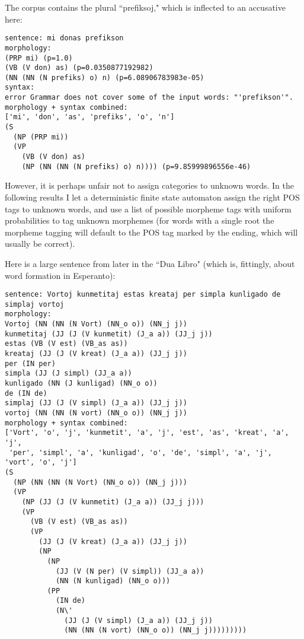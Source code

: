 \documentclass[10pt,a4paper]{article}
\begin{document}
The corpus contains the plural ``prefiksoj," which is inflected to an accusative here:

\begin{verbatim}
sentence: mi donas prefikson
morphology:
(PRP mi) (p=1.0)
(VB (V don) as) (p=0.0350877192982)
(NN (NN (N prefiks) o) n) (p=6.08906783983e-05)
syntax:
error Grammar does not cover some of the input words: "'prefikson'".
morphology + syntax combined:
['mi', 'don', 'as', 'prefiks', 'o', 'n']
(S
  (NP (PRP mi))
  (VP
    (VB (V don) as)
    (NP (NN (NN (N prefiks) o) n)))) (p=9.85999896556e-46)
\end{verbatim}

However, it is perhaps unfair not to assign categories to unknown words. 
In the following results I let a deterministic finite state automaton
assign the right POS tags to unknown words, and use a list of possible
morpheme tags with uniform probabilities to tag unknown morphemes (for words
with a single root the morpheme tagging will default to the POS tag marked
by the ending, which will usually be correct).

Here is a large sentence from later in the ``Dua Libro" (which is, fittingly,
about word formation in Esperanto):

\begin{verbatim}
sentence: Vortoj kunmetitaj estas kreataj per simpla kunligado de simplaj vortoj
morphology:
Vortoj (NN (NN (N Vort) (NN_o o)) (NN_j j))
kunmetitaj (JJ (J (V kunmetit) (J_a a)) (JJ_j j))
estas (VB (V est) (VB_as as))
kreataj (JJ (J (V kreat) (J_a a)) (JJ_j j))
per (IN per)
simpla (JJ (J simpl) (JJ_a a))
kunligado (NN (J kunligad) (NN_o o))
de (IN de)
simplaj (JJ (J (V simpl) (J_a a)) (JJ_j j))
vortoj (NN (NN (N vort) (NN_o o)) (NN_j j))
morphology + syntax combined:
['Vort', 'o', 'j', 'kunmetit', 'a', 'j', 'est', 'as', 'kreat', 'a', 'j', 
 'per', 'simpl', 'a', 'kunligad', 'o', 'de', 'simpl', 'a', 'j', 'vort', 'o', 'j']
(S
  (NP (NN (NN (N Vort) (NN_o o)) (NN_j j)))
  (VP
    (NP (JJ (J (V kunmetit) (J_a a)) (JJ_j j)))
    (VP
      (VB (V est) (VB_as as))
      (VP
        (JJ (J (V kreat) (J_a a)) (JJ_j j))
        (NP
          (NP
            (JJ (V (N per) (V simpl)) (JJ_a a))
            (NN (N kunligad) (NN_o o)))
          (PP
            (IN de)
            (N\'
              (JJ (J (V simpl) (J_a a)) (JJ_j j))
              (NN (NN (N vort) (NN_o o)) (NN_j j)))))))))
\end{verbatim}
\end{document}
